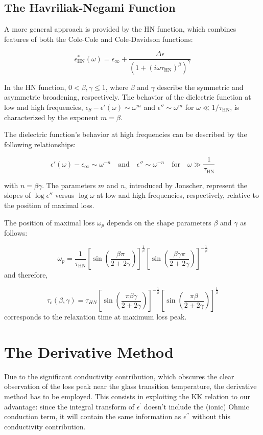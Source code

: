 \subsection{The Havriliak-Negami Function}
A more general approach is provided by the \ac{HN} function, which combines features of both the Cole-Cole and Cole-Davidson functions:

\[
\epsilon^*_{\text{HN}}(\omega) = \epsilon_\infty + \frac{\Delta \epsilon}{(1 + (i \omega \tau_{\text{HN}})^\beta)^\gamma}
\]

In the HN function, \( 0 < \beta, \gamma \leq 1 \), where \( \beta \) and \( \gamma \) describe the symmetric and asymmetric broadening, respectively. The behavior of the dielectric function at low and high frequencies, \( \epsilon_S - \epsilon'(\omega) \sim \omega^m \) and \( \epsilon'' \sim \omega^m \) for \( \omega \ll 1/\tau_{\text{HN}} \), is characterized by the exponent \( m = \beta \).


The dielectric function's behavior at high frequencies can be described by the following relationships:

\[
\epsilon'(\omega) - \epsilon_\infty \sim \omega^{-n} \quad \text{and} \quad \epsilon'' \sim \omega^{-n} \quad \text{for} \quad \omega \gg \frac{1}{\tau_{\text{HN}}}
\]

with \( n = \beta \gamma \). The parameters \( m \) and \( n \), introduced by Jonscher, represent the slopes of \( \log \epsilon'' \) versus \( \log \omega \) at low and high frequencies, respectively, relative to the position of maximal loss.

The position of maximal loss \( \omega_p \) depends on the shape parameters \( \beta \) and \( \gamma \) as follows:

\[
\omega_p = \frac{1}{\tau_{\text{HN}}} \left[ \sin \left(\frac{\beta \pi}{2 + 2\gamma}\right) \right]^{\frac{1}{\beta}} \left[\sin \left(\frac{\beta \gamma \pi}{2 + 2\gamma}\right)\right]^{-\frac{1}{\beta}}
\]
and therefore,

\[
	\tau_c(\beta, \gamma) = \tau_{HN} \left[\sin\left(\frac{\pi \beta \gamma}{2 + 2\gamma}\right)\right]^{-\frac{1}{\beta}} \left[\sin\left(\frac{\pi \beta}{2 + 2\gamma}\right)\right]^{\frac{1}{\beta}}
\]
corresponds to the relaxation time at maximum loss peak.
\section{The Derivative Method}

Due to the significant conductivity contribution, which obscures the clear observation of the loss peak near the glass transition temperature, the derivative method has to be employed. %
This consists in exploiting the \ac{KK} relation to our advantage: since the integral transform of $\epsilon^\prime$ doesn't include the (ionic) Ohmic conduction term, it will contain the same information as $\epsilon^{\prime\prime}$ without this conductivity contribution.


